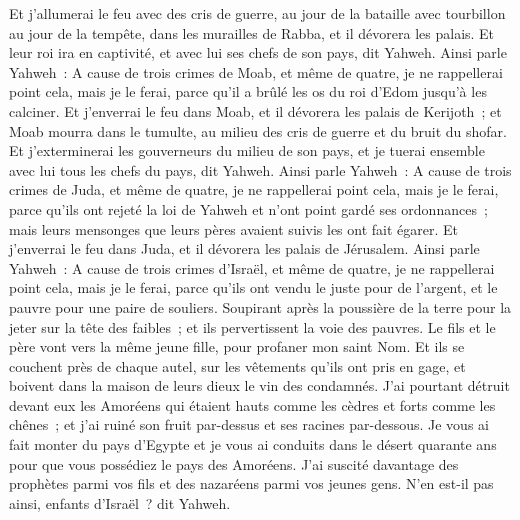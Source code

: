 \begin{multicols}{2}
Et j'allumerai le feu avec des cris de guerre, au jour de la bataille avec tourbillon au jour de la tempête, dans les murailles de Rabba, et il dévorera les palais.
Et leur roi ira en captivité, et avec lui ses chefs de son pays, dit Yahweh.
\VerseOne{}Ainsi parle Yahweh~: A cause de trois crimes de Moab, et même de quatre, je ne rappellerai point cela, mais je le ferai, parce qu'il a brûlé les os du roi d'Edom jusqu'à les calciner.
Et j'enverrai le feu dans Moab, et il dévorera les palais de Kerijoth~; et Moab mourra dans le tumulte, au milieu des cris de guerre et du bruit du shofar.
Et j'exterminerai les gouverneurs du milieu de son pays, et je tuerai ensemble avec lui tous les chefs du pays, dit Yahweh.
Ainsi parle Yahweh~: A cause de trois crimes de Juda, et même de quatre, je ne rappellerai point cela, mais je le ferai, parce qu'ils ont rejeté la loi de Yahweh et n'ont point gardé ses ordonnances~; mais leurs mensonges que leurs pères avaient suivis les ont fait égarer.
Et j'enverrai le feu dans Juda, et il dévorera les palais de Jérusalem.
Ainsi parle Yahweh~: A cause de trois crimes d'Israël, et même de quatre, je ne rappellerai point cela, mais je le ferai, parce qu'ils ont vendu le juste pour de l'argent, et le pauvre pour une paire de souliers.
Soupirant après la poussière de la terre pour la jeter sur la tête des faibles~; et ils pervertissent la voie des pauvres. Le fils et le père vont vers la même jeune fille, pour profaner mon saint Nom.
Et ils se couchent près de chaque autel, sur les vêtements qu'ils ont pris en gage, et boivent dans la maison de leurs dieux le vin des condamnés.
J'ai pourtant détruit devant eux les Amoréens qui étaient hauts comme les cèdres et forts comme les chênes~; et j'ai ruiné son fruit par-dessus et ses racines par-dessous.
Je vous ai fait monter du pays d'Egypte et je vous ai conduits dans le désert quarante ans pour que vous possédiez le pays des Amoréens.
J'ai suscité davantage des prophètes parmi vos fils et des nazaréens parmi vos jeunes gens. N'en est-il pas ainsi, enfants d'Israël~? dit Yahweh.

\end{multicols}
